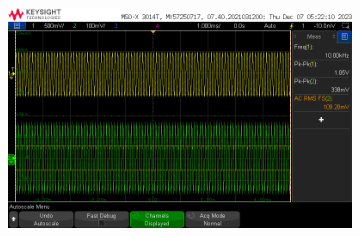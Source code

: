 \documentclass[notitlepage, 12pt]{report}
\begin{document}
\begin{enumerate}
\begin{figure}
\begin{subfigure}{0.3\textwidth}
            \includegraphics[scale=0.2]{images/maxvolhigh.png}
        \end{subfigure}    
    

\end{figure}
\end{enumerate}
\end{document}
